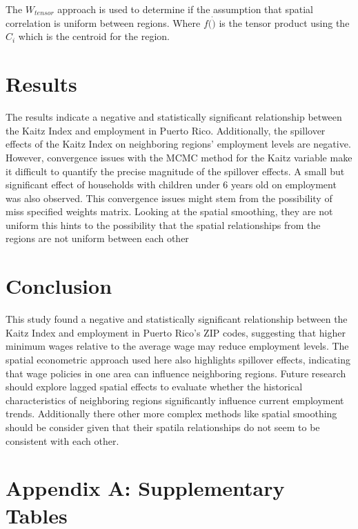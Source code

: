 \documentclass[12pt]{article}
\begin{document}
The $W_{tensor}$ approach is used to determine if the assumption that spatial correlation is uniform between regions. Where $f(\dot)$ is the
tensor product using the $C_i$ which is the centroid for the region.

\section{Results}

The results indicate a negative and statistically significant relationship between the Kaitz
Index and employment in Puerto Rico. Additionally, the spillover effects of the Kaitz
Index on neighboring regions’ employment levels are negative. However, convergence issues
with the MCMC method for the Kaitz variable make it difficult to quantify the precise
magnitude of the spillover effects. A small but significant effect of households
with children under 6 years old on employment was also observed. This convergence issues
might stem from the possibility of miss specified weights matrix. Looking at the spatial smoothing,
they are not uniform this hints to the possibility that the spatial relationships from the regions
are not uniform between each other

\section{Conclusion}

This study found a negative and statistically significant relationship between the Kaitz Index
and employment in Puerto Rico's ZIP codes, suggesting that higher minimum wages relative to the
average wage may reduce employment levels. The spatial econometric approach used here also
highlights spillover effects, indicating that wage policies in one area can influence neighboring
regions. Future research should explore lagged spatial effects to evaluate whether the historical
characteristics of neighboring regions significantly influence current employment trends. Additionally
there other more complex methods like spatial smoothing should be consider given that their spatila relationships
do not seem to be consistent with each other.

\printbibliography

\appendix
\section*{Appendix A: Supplementary Tables}
\setcounter{table}{0} %
\renewcommand{\thetable}{A\arabic{table}} %
\end{document}
